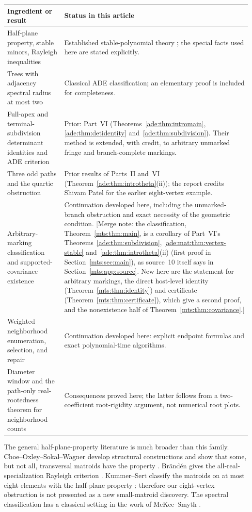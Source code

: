 \documentclass[11pt]{article}
\numberwithin{equation}{section}
\theoremstyle{definition}
\begin{document}
\begin{center}
\small
\begin{tabularx}{\textwidth}{@{}p{}X@{}}
\toprule
Ingredient or result & Status in this article\\
\midrule
Half-plane property, stable minors, Rayleigh inequalities & Established
stable-polynomial theory \cite{COSW,Branden}; the special facts used here
are stated explicitly.\\
Trees with adjacency spectral radius at most two & Classical ADE
classification; an elementary proof is included for completeness.\\
Full-apex and terminal-subdivision determinant identities and ADE criterion &
Prior: Part~VI (Theorems~\ref{ade:thm:intromain}, \ref{ade:thm:detidentity}
and~\ref{ade:thm:subdivision}). Their method is extended, with credit, to
arbitrary unmarked fringe and branch-complete markings.\\
Three odd paths and the quartic obstruction & Prior results of Parts~II
and~VI (Theorem~\ref{ade:thm:introtheta}(ii)); the report credits Shivam
Patel for the earlier eight-vertex example.\\
Arbitrary-marking classification and supported-covariance existence &
Continuation developed here, including the unmarked-branch obstruction
and exact necessity of the geometric condition. [Merge note: the
classification, Theorem~\ref{mts:thm:main}, is a corollary of Part~VI's
Theorems~\ref{ade:thm:subdivision}, \ref{ade:mat:thm:vertex-stable}
and~\ref{ade:thm:introtheta}(ii) (first proof in
Section~\ref{mts:sec:main}), as source~10 itself says in
Section~\ref{mts:app:source}. New here are the statement for arbitrary
markings, the direct host-level identity
(Theorem~\ref{mts:thm:identity}) and certificate
(Theorem~\ref{mts:thm:certificate}), which give a second proof, and the
nonexistence half of Theorem~\ref{mts:thm:covariance}.]\\
Weighted neighborhood enumeration, selection, and repair &
Continuation developed here: explicit endpoint formulas and exact
polynomial-time algorithms.\\
Diameter window and the path-only real-rootedness theorem for neighborhood counts &
Consequences proved here; the latter follows from a two-coefficient
root-rigidity argument, not numerical root plots.\\
\bottomrule
\end{tabularx}
\end{center}

The general half-plane-property literature is much broader than this family.
Choe--Oxley--Sokal--Wagner develop structural constructions and show that
some, but not all, transversal matroids have the property \cite{COSW}.
Br\"and\'en gives the all-real-specialization Rayleigh criterion
\cite[Theorem 5.6]{Branden}. Kummer--Sert classify the matroids on at most
eight elements with the half-plane property \cite{KummerSert}; therefore
our eight-vertex obstruction is not presented as a new small-matroid
discovery. The spectral classification has a classical setting in the work
of McKee--Smyth \cite{McKeeSmythIMRN}.
\end{document}
